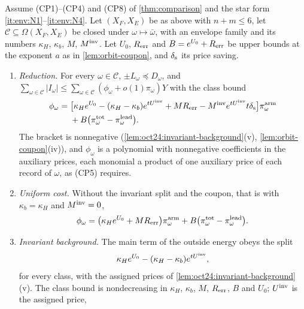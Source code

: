 \begin{theorem}\label{thm:envelopes}
Assume (CP1)--(CP4) and (CP8) of \cref{thm:comparison} and the star form
\ref{it:env:N1}--\ref{it:env:N4}. Let $(X_F,X_E)$ be as above with $n+m\le6$, let
$\mathcal C\subseteq\Omega(X_F,X_E)$ be closed under $\omega\mapsto\bar\omega$, with an envelope
family and its numbers $\kappa_H$, $\kappa_b$, $M$, $M^{\rm inv}$. Let $U_0$, $R_{\rm err}$ and
$B=e^{U_0}+R_{\rm err}$ be upper bounds at the exponent $a$ as in
\cref{lem:orbit-coupon}, and $\delta_{\rm s}$ its price saving.
\begin{enumerate}[label=(\roman*)]
\item \emph{Reduction.} For every $\omega\in\mathcal C$, $\pm L_\omega\preceq D_\omega$, and
 $\sum_{\omega\in\mathcal C}|I_\omega|\le\sum_{\omega\in\mathcal C}(\phi_\omega+o(1)\pi_\omega)Y$ with the
 class bound
 \begin{equation}\label{eq:envelope-class-bound}
 \begin{split}
  \phi_\omega={}&\bigl[\kappa_He^{U_0}-(\kappa_H-\kappa_b)e^{tU^{\mathrm{inv}}}+MR_{\rm err}
  -M^{\rm inv}e^{tU^{\mathrm{inv}}}t\delta_{\rm s}\bigr]\pi^{\rm arm}_\omega\\
  &+B\bigl(\pi^{\rm tot}_\omega-\pi^{\rm lead}_\omega\bigr).
 \end{split}
 \end{equation}
 The bracket is nonnegative (\cref{lem:oct24:invariant-background}(v),
 \cref{lem:orbit-coupon}(iv)), and $\phi_\omega$ is a polynomial
 with nonnegative coefficients in the auxiliary prices, each monomial a product of
 one auxiliary price of each record of $\omega$, as (CP5) requires.
\item \emph{Uniform cost.} Without the invariant split and the coupon, that is with
 $\kappa_b=\kappa_H$ and $M^{\rm inv}=0$,
 \begin{equation}\label{eq:oct24:envelope-cost}
  \phi_\omega=\bigl(\kappa_He^{U_0}+MR_{\rm err}\bigr)\pi^{\rm arm}_\omega
  +B\bigl(\pi^{\rm tot}_\omega-\pi^{\rm lead}_\omega\bigr).
 \end{equation}
\item \emph{Invariant background.} The main term of the outside energy obeys the split
 \begin{equation}\label{eq:envelope-background}
  \kappa_He^{U_0}-(\kappa_H-\kappa_b)e^{tU^{\mathrm{inv}}},
 \end{equation}
 for every class, with the assigned prices of
 \cref{lem:oct24:invariant-background}(v). The class bound is nondecreasing in
 $\kappa_H$, $\kappa_b$, $M$, $R_{\rm err}$, $B$ and $U_0$; $U^{\mathrm{inv}}$ is the assigned price,

\end{enumerate}
\end{theorem}
